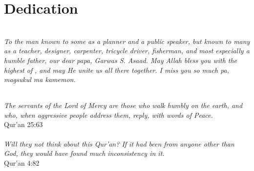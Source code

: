 \chapter*{Dedication}
\begin{center}
    \\

    \textit{To the man known to some as a planner and a public speaker, but known to many as a teacher, designer, carpenter, tricycle driver, fisherman, and most especially a humble father, our dear papa, Garwas S. Asaad. May Allah  bless you with the highest of}  \textit{, and may He unite us all there together. I miss you so much pa, magsukul ma kamemon.}\\
    \begin{minipage}{.6\linewidth}
        \centering
        \vspace{4cm}
        \\
        \textit{The servants of the Lord of Mercy are those who walk humbly on the earth, and who, when aggressive people address them, reply, with words of Peace.}\\
        {\sc Qur'an 25:63}\\[2cm]
        \\
        \textit{Will they not think about this Qur'an? If it had been from anyone other than God, they would have found much inconsistency in it.}\\
        {\sc Qur'an 4:82}\\[1cm]
    \end{minipage}
\end{center}